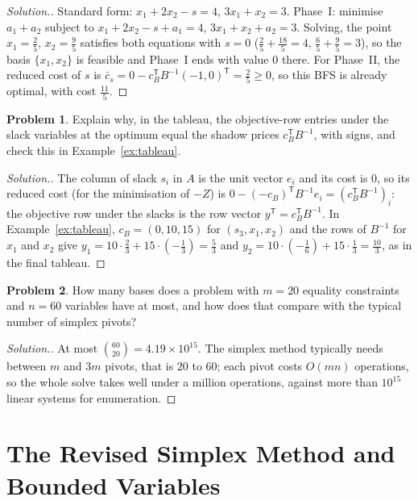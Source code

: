 \documentclass[11pt,a4paper]{article}
\numberwithin{equation}{section}
\theoremstyle{definition}
\newtheorem{problemx}{Problem}[subsection]
\newenvironment{problem}{\begin{problemx}}{\end{problemx}}
\newenvironment{solution}
  {\renewcommand{\qedsymbol}{}\begin{proof}[\textit{Solution}.]}
  {\end{proof}}
\begin{document}
\begin{solution}
Standard form: $x_1 + 2x_2 - s = 4$, $3x_1 + x_2 = 3$. Phase~I: minimise $a_1 + a_2$ subject to $x_1 + 2x_2 - s + a_1 = 4$, $3x_1 + x_2 + a_2 = 3$. Solving, the point $x_1 = \frac25$, $x_2 = \frac95$ satisfies both equations with $s = 0$ ($\frac25 + \frac{18}5 = 4$, $\frac65 + \frac95 = 3$), so the
basis $\{x_1, x_2\}$ is feasible and Phase~I ends with value $0$ there. For Phase~II, the reduced cost of $s$ is $\bar c_s = 0 - c_B^{\mathsf T}B^{-1}(-1, 0)^{\mathsf T} = \frac25 \geq 0$, so this BFS is already optimal, with cost $\frac{11}5$.
\end{solution}

\begin{problem}
Explain why, in the tableau, the objective-row entries under the slack variables at the optimum equal the shadow prices $c_B^{\mathsf T}B^{-1}$, with signs, and check this in Example~\ref{ex:tableau}.
\end{problem}

\begin{solution}
The column of slack $s_i$ in $A$ is the unit vector $e_i$ and its cost is $0$, so its reduced cost (for the minimisation of $-Z$) is $0 - (-c_B)^{\mathsf T}B^{-1}e_i = (c_B^{\mathsf T}B^{-1})_i$: the objective row under the slacks is the row vector $y^{\mathsf T} = c_B^{\mathsf T}B^{-1}$. In Example~\ref{ex:tableau},
$c_B = (0, 10, 15)$ for $(s_3, x_1, x_2)$ and the rows of $B^{-1}$ for $x_1$ and $x_2$ give $y_1 = 10\cdot\frac23 + 15\cdot(-\frac13) = \frac53$ and $y_2 = 10\cdot(-\frac16) + 15\cdot\frac13 = \frac{10}3$, as in the final tableau.
\end{solution}

\begin{problem}
How many bases does a problem with $m = 20$ equality constraints and $n = 60$ variables have at most, and how does that compare with the typical number of simplex pivots?
\end{problem}

\begin{solution}
At most $\binom{60}{20} = 4.19 \times 10^{15}$. The simplex method typically needs between $m$ and $3m$ pivots, that is $20$ to $60$; each pivot costs $O(mn)$ operations, so the whole solve takes well under a million operations, against more than $10^{15}$ linear systems for enumeration.
\end{solution}

\section{The Revised Simplex Method and Bounded Variables}
\label{sec:revised}
\end{document}
